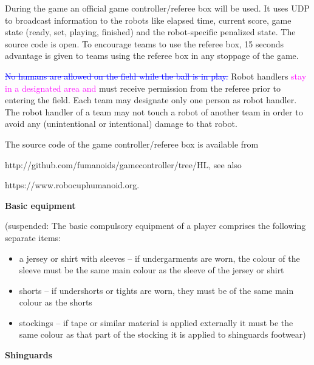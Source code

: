 \bigskip

During the game an official game controller/referee box will be used. It uses UDP to broadcast information to the robots like elapsed time, current score, game state (ready, set, playing, finished) and the robot-specific penalized state. The source code is open. To encourage teams to use the referee box, 15 seconds advantage is given to teams using the referee box in any stoppage of the game.



\bigskip

\textcolor{blue}{\sout{No humans are allowed on the field while the ball is in play.}} Robot handlers \textcolor{magenta}{stay in a designated area and} must receive permission from the referee prior to entering the field. Each team may designate only one person as robot handler. The robot handler of a team may not touch a robot of another team in order to avoid any (unintentional or intentional) damage to that robot. 

\bigskip

The source code of the game controller/referee box is available from 

\textcolor[rgb]{0.0,0.0,0.49803922}{http://github.com/fumanoids/gamecontroller/tree/HL},
see also 

\textcolor[rgb]{0.0,0.0,0.49803922}{https://www.robocuphumanoid.org}.

\bigskip

{\bfseries Basic equipment}

\headlinebox

{\color[rgb]{0.4,0.4,0.4}
(suspended: The basic compulsory equipment of a player comprises the following separate items:

\begin{itemize}
\item a jersey or shirt with sleeves -- if undergarments are worn, the colour of the sleeve must be the same main colour as the sleeve of the jersey or shirt 
\item shorts -- if undershorts or tights are worn, they must be of the same main colour as the shorts
\item stockings -- if tape or similar material is applied externally it must be the same colour as that part of the stocking it is applied to shinguards footwear) 
\end{itemize}
}

\bigskip

{\bfseries Shinguards}

